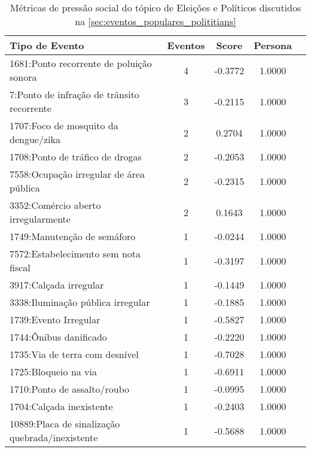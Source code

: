 \begin{table}[htbp]
	\centering
	\caption{Métricas de pressão social do tópico de Eleições e Políticos discutidos na \autoref{sec:eventos_populares_polititians}}
	\label{tab:eventos_populares_polititians}
	\begin{tabular}{|l|c|c|c|c|}
		\hline
		\textbf{Tipo de Evento}                         & \textbf{Eventos} & \textbf{Score} & \textbf{Persona} \\
		\hline
		1681:Ponto recorrente de poluição sonora        & 4                & -0.3772        & 1.0000           \\
		\hline
		7:Ponto de infração de trânsito recorrente      & 3                & -0.2115        & 1.0000           \\
		\hline
		1707:Foco de mosquito da dengue/zika            & 2                & 0.2704         & 1.0000           \\
		\hline
		1708:Ponto de tráfico de drogas                 & 2                & -0.2053        & 1.0000           \\
		\hline
		7558:Ocupação irregular de área pública         & 2                & -0.2315        & 1.0000           \\
		\hline
		3352:Comércio aberto irregularmente             & 2                & 0.1643         & 1.0000           \\
		\hline
		1749:Manutenção de semáforo                     & 1                & -0.0244        & 1.0000           \\
		\hline
		7572:Estabelecimento sem nota fiscal            & 1                & -0.3197        & 1.0000           \\
		\hline
		3917:Calçada irregular                          & 1                & -0.1449        & 1.0000           \\
		\hline
		3338:Iluminação pública irregular               & 1                & -0.1885        & 1.0000           \\
		\hline
		1739:Evento Irregular                           & 1                & -0.5827        & 1.0000           \\
		\hline
		1744:Ônibus danificado                          & 1                & -0.2220        & 1.0000           \\
		\hline
		1735:Via de terra com desnível                  & 1                & -0.7028        & 1.0000           \\
		\hline
		1725:Bloqueio na via                            & 1                & -0.6911        & 1.0000           \\
		\hline
		1710:Ponto de assalto/roubo                     & 1                & -0.0995        & 1.0000           \\
		\hline
		1704:Calçada inexistente                        & 1                & -0.2403        & 1.0000           \\
		\hline
		10889:Placa de sinalização quebrada/inexistente & 1                & -0.5688        & 1.0000           \\
		\hline
	\end{tabular}
\end{table}


